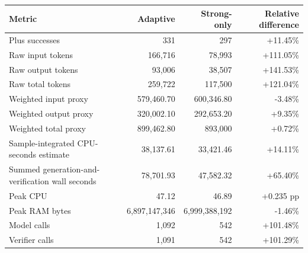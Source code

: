 \begin{tabular}{lrrr}
\toprule
Metric & Adaptive & Strong-only & Relative difference \\
\midrule
Plus successes & 331 & 297 & +11.45\% \\
Raw input tokens & 166,716 & 78,993 & +111.05\% \\
Raw output tokens & 93,006 & 38,507 & +141.53\% \\
Raw total tokens & 259,722 & 117,500 & +121.04\% \\
Weighted input proxy & 579,460.70 & 600,346.80 & -3.48\% \\
Weighted output proxy & 320,002.10 & 292,653.20 & +9.35\% \\
Weighted total proxy & 899,462.80 & 893,000 & +0.72\% \\
Sample-integrated CPU-seconds estimate & 38,137.61 & 33,421.46 & +14.11\% \\
Summed generation-and-verification wall seconds & 78,701.93 & 47,582.32 & +65.40\% \\
Peak CPU & 47.12 & 46.89 & +0.235 pp \\
Peak RAM bytes & 6,897,147,346 & 6,999,388,192 & -1.46\% \\
Model calls & 1,092 & 542 & +101.48\% \\
Verifier calls & 1,091 & 542 & +101.29\% \\
\bottomrule
\end{tabular}
